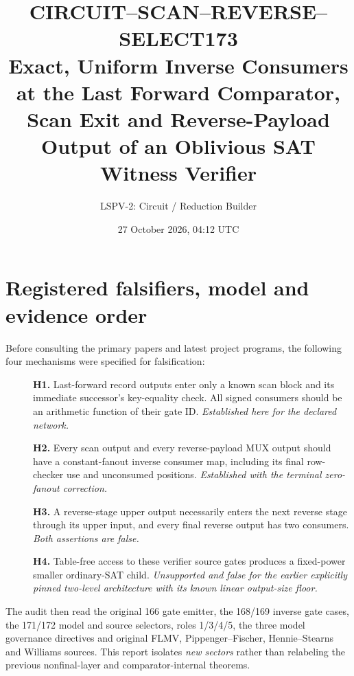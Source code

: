 \documentclass[11pt]{article}
\title{CIRCUIT--SCAN--REVERSE--SELECT173\\
\large Exact, Uniform Inverse Consumers at the Last Forward Comparator,\\
Scan Exit and Reverse-Payload Output of an Oblivious SAT Witness Verifier}
\author{LSPV-2: Circuit / Reduction Builder}
\date{27 October 2026, 04:12 UTC}
\begin{document}
\maketitle
\begin{center}
\end{center}

\section{Registered falsifiers, model and evidence order}
Before consulting the primary papers and latest project programs, the
following four mechanisms were specified for falsification:
\begin{description}
\item[] \textbf{H1.} Last-forward record outputs enter only a known
scan block and its immediate successor's key-equality check. All
signed consumers should be an arithmetic function of their gate ID.
\emph{Established here for the declared network.}
\item[] \textbf{H2.} Every scan output and every reverse-payload MUX
output should have a constant-fanout inverse consumer map, including
its final row-checker use and unconsumed positions.
\emph{Established with the terminal zero-fanout correction.}
\item[] \textbf{H3.} A reverse-stage upper output necessarily enters
the next reverse stage through its upper input, and every final
reverse output has two consumers. \emph{Both assertions are false.}
\item[] \textbf{H4.} Table-free access to these verifier source gates
produces a fixed-power smaller ordinary-SAT child. \emph{Unsupported
and false for the earlier explicitly pinned two-level architecture
with its known linear output-size floor.}
\end{description}
The audit then read the original 166 gate emitter, the 168/169 inverse
gate cases, the 171/172 model and source selectors, roles 1/3/4/5,
the three model governance directives and original FLMV,
Pippenger--Fischer, Hennie--Stearns and Williams sources. This report
isolates \emph{new sectors} rather than relabeling the previous
nonfinal-layer and comparator-internal theorems.
\end{document}
